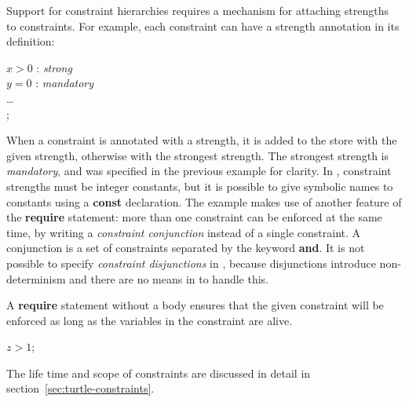 %
Support for constraint hierarchies requires a mechanism for attaching
strengths to constraints.  For example, each constraint can have a
strength annotation in its definition:
%
\begin{ttlprog}
\>\ttlRequire{} $x > 0$ : {\em strong} \ttlAnd{}\\
\>\>\>\>\>$y = 0$ : {\em mandatory} \ttlIn{}\\
\>\>\dots\\
\>\ttlEnd{};
\end{ttlprog}
%
%
When a constraint is annotated with a strength, it is added to the
store with the given strength, otherwise with the strongest strength.
The strongest strength is {\em mandatory}, and was specified in the
previous example for clarity.  In \turtle{}, constraint strengths must
be integer constants, but it is possible to give symbolic names to
constants using a {\bf const} declaration.  The example makes use of
another feature of the {\bf require} statement: more than one
constraint can be enforced at the same time, by writing a {\em
  constraint
  conjunction}%
%
%
 instead of a single constraint.  A conjunction is
a set of constraints separated by the keyword {\bf and}.
It is not possible to specify {\em constraint disjunctions}%
%
%
 in \turtle{}, because disjunctions introduce
non-determinism and there are no means in \turtle{} to handle this.

A {\bf require} statement without a body ensures that the given
constraint will be enforced as long as the variables in the constraint
are alive.
%
\begin{ttlprog}
\>\ttlRequire{} $z > 1$;
\end{ttlprog}
%
The life time and scope of constraints are discussed in detail in
section~\ref{sec:turtle-constraints}.




